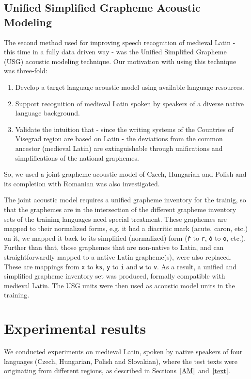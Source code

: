\documentclass[runningheads,a4paper]{llncs}
\begin{document}
\subsection{Unified Simplified Grapheme Acoustic Modeling}\label{usg}
The second method used for improving speech recognition of medieval Latin - this time in a fully data driven way - was the Unified Simplified Grapheme (USG) acoustic modeling technique.
Our motivation with using this technique was three-fold:
\begin{enumerate}
\item Develop a target language acoustic model using available language resources.
\item Support recognition of medieval Latin spoken by speakers of a diverse native language background.
\item Validate the intuition that - since the writing systems of the Countries of Visegrad region are based on Latin - the deviations from the common ancestor (medieval Latin) are extinguishable through unifications and simplifications of the national graphemes.
\end{enumerate}
So, we used a joint grapheme acoustic model of Czech, Hungarian and Polish and its completion with Romanian was also investigated. 

The joint acoustic model requires a unified grapheme inventory for the trainig, so that the graphemes are in the intersection of the different grapheme inventory sets of the training languages need special treatment.
These graphemes are mapped to their normalized forms, e.g. it had a diacritic mark (acute, caron, etc.) on it, we mapped it back to its simplified (normalized) form (\texttt{\v{r}} to \texttt{r}, \texttt{\'{o}} to \texttt{o}, etc.).
Further than that, those graphemes that are non-native to Latin, and can straightforwardly mapped to a native Latin grapheme(s), were also replaced.
These are mappings from \texttt{x} to \texttt{ks}, \texttt{y} to \texttt{i} and \texttt{w} to \texttt{v}.
As a result, a unified and simplified grapheme inventory set was produced, formally compatible with medieval Latin.
The USG units were then used as acoustic model units in the training.
\section{Experimental results}\label{results}
We conducted experiments on medieval Latin, spoken by native speakers of four languages (Czech, Hungarian, Polish and Slovakian), where the test texts were originating from different regions, as described in Sections~\ref{AM}~and~\ref{text}.
\end{document}
